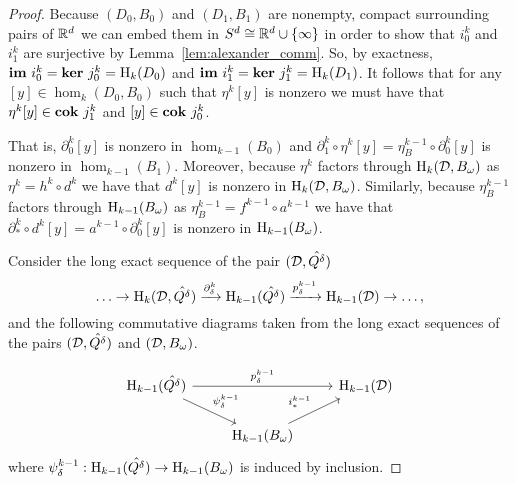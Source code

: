 \begin{proof}
  Because $(D_0, B_0)$ and $(D_1, B_1)$ are nonempty, compact surrounding pairs of $\mathbb{R}^d$ we can embed them in $S^d \cong \mathbb{R}^d\cup\{\infty\}$ in order to show that $i_0^k$ and $i_1^k$ are surjective by Lemma~\ref{lem:alexander_comm}.
  So, by exactness, $\mathbf{im}~i_0^k = \mathbf{ker}~j_0^k = \mathrm{H}_k(D_0)$ and $\mathbf{im}~i_1^k = \mathbf{ker}~j_1^k = \mathrm{H}_k(D_1)$.
  It follows that for any $[y]\in \hom_k(D_0, B_0)$ such that $\eta^k[y]$ is nonzero we must have that $\eta^k[y]\in\mathbf{cok}~j^k_1$ and $[y]\in\mathbf{cok}~j^k_0$.

  That is, $\partial_0^k[y]$ is nonzero in $\hom_{k-1}(B_0)$ and $\partial_1^k\circ\eta^k[y] = \eta_B^{k-1}\circ\partial_0^k[y]$ is nonzero in $\hom_{k-1}(B_1)$.
  Moreover, because $\eta^k$ factors through $\mathrm{H}_k({\mathcal{D}}, B_{\omega})$ as $\eta^k = h^k\circ d^k$ we have that $d^k[y]$ is nonzero in $\mathrm{H}_k({\mathcal{D}},B_{\omega})$.
  Similarly, because $\eta^{k-1}_B$ factors through $\mathrm{H}_{k-1}(B_{\omega})$ as $\eta^{k-1}_B = f^{k-1}\circ a^{k-1}$ we have that $\partial^k_*\circ d^k[y] = a^{k-1}\circ \partial_0^k[y]$ is nonzero in $\mathrm{H}_{k-1}(B_{\omega})$.

  Consider the long exact sequence of the pair $({\mathcal{D}}, \hat{Q^\delta})$
  \[\ldots\to\mathrm{H}_k({\mathcal{D}}, \hat{Q^\delta})\xrightarrow{\partial^k_\delta}
    \mathrm{H}_{k-1}(\hat{Q^\delta})\xrightarrow{p^{k-1}_\delta}
    \mathrm{H}_{k-1}({\mathcal{D}})\to\ldots,\]
  and the following commutative diagrams taken from the long exact sequences of the pairs $({\mathcal{D}}, \hat{Q^\delta})$ and $({\mathcal{D}}, B_{\omega})$.

  \begin{equation}\label{eq:main1}\begin{tikzcd}
      \hom_{k-1}(\hat{Q^\delta})\arrow{dr}{\psi_\delta^{k-1}}\arrow{rr}{p_\delta^{k-1}} & &
      \hom_{k-1}(\D)\\
    & \hom_{k-1}(\B)\arrow{ur}{i_*^{k-1}}
  \end{tikzcd}\end{equation}
  where $\psi_\delta^{k-1} : \mathrm{H}_{k-1}(\hat{Q^\delta})\to \mathrm{H}_{k-1}(B_{\omega})$ is induced by inclusion.


\end{proof}
